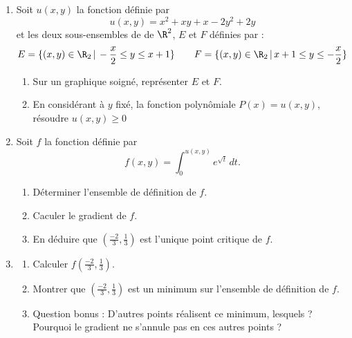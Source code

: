 



\begin{exercice}
\begin{enumerate}
\item Soit $u(x,y)$ la fonction définie par 
$$u(x,y) = x^2+xy +x-2y^2+2y$$
et  les deux sous-ensembles de de $\R^2$, $E$ et $F$ définies par : 
$$E = \{ (x,y) \in \R_2 \, | \,  -\frac{x}{2} \leq  y  \leq x+1\}\quad \quad F = \{ (x,y) \in \R_2 \, | \, x+1 \leq  y  \leq - \frac{x}{2}\}$$

\begin{enumerate}
\item Sur un graphique soigné,  représenter $E$ et $F$. 
\item En considérant à $y$  fixé, la fonction polynômiale $P(x) = u(x,y)$, résoudre $u(x,y)\geq 0$\\
\end{enumerate}
\item   Soit $f$ la fonction définie par  $$f(x,y) = \int_{0}^{u(x,y) }e^{\sqrt{t}}\,  dt.$$
\begin{enumerate}
\item Déterminer l'ensemble de définition de $f$. 
\item Caculer le gradient de $f$.
\item En déduire que $\left(\frac{-2}{3},\frac{1}{3}\right)$ est l'unique point critique de $f$. 
\end{enumerate}
\item 
\begin{enumerate}
\item Calculer $f\left(\frac{-2}{3},\frac{1}{3}\right)$.
\item Montrer que $\left(\frac{-2}{3},\frac{1}{3}\right)$ est un minimum sur l'ensemble de définition de $f$. 
\item Question bonus  : D'autres points réalisent ce minimum, lesquels ? Pourquoi le gradient ne s'annule pas en ces autres points ? 
\end{enumerate}
\end{enumerate}
\end{exercice}




